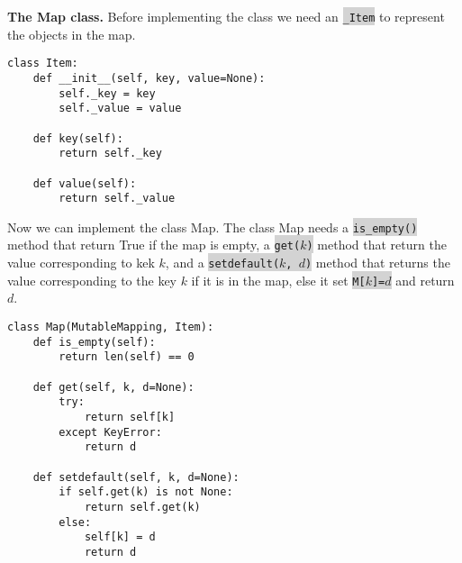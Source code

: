 \documentclass[10pt]{article}
\newcommand{\code}[1]{{\small\colorbox{LightGray}{\texttt{#1}}}}
\begin{document}
\textbf{The Map class.} Before implementing the class we need an \code{\_Item} to represent the objects in the map.
\begin{verbatim}
class Item:
    def __init__(self, key, value=None):
        self._key = key
        self._value = value
     
    def key(self):
        return self._key
        
    def value(self):
        return self._value
\end{verbatim}
Now we can implement the class Map. The class Map needs a \code{is\_empty()} method that return True if the map is empty, a \code{get($k$)} method that return the value corresponding to kek $k$, and a \code{setdefault($k$, $d$)} method that returns the value corresponding to the key $k$ if it is in the map, else it set \code{M[$k$]=$d$} and return $d$. 
\begin{verbatim}
class Map(MutableMapping, Item):
    def is_empty(self):
        return len(self) == 0
    
    def get(self, k, d=None):
        try:
            return self[k]
        except KeyError:
            return d
            
    def setdefault(self, k, d=None):
        if self.get(k) is not None:
            return self.get(k)
        else:
            self[k] = d
            return d
\end{verbatim}
\end{document}
